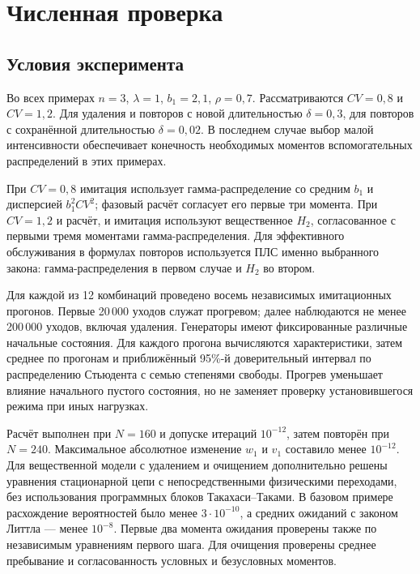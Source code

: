 \documentclass[a4paper,12pt]{article}
\begin{document}
\section{Численная проверка}\label{sec:results}
\subsection{Условия эксперимента}
Во всех примерах \(n=3\), \(\lambda=1\), \(b_1=2{,}1\), \(\rho=0{,}7.\) Рассматриваются \(CV=0{,}8\) и \(CV=1{,}2.\) Для удаления и повторов с новой длительностью \(\delta=0{,}3\), для повторов с сохранённой длительностью \(\delta=0{,}02.\) В последнем случае выбор малой интенсивности обеспечивает конечность необходимых моментов вспомогательных распределений в этих примерах.

При \(CV=0{,}8\) имитация использует гамма-распределение со средним \(b_1\) и дисперсией \(b_1^2CV^2\); фазовый расчёт согласует его первые три момента. При \(CV=1{,}2\) и расчёт, и имитация используют вещественное \(H_2\), согласованное с первыми тремя моментами гамма-распределения. Для эффективного обслуживания в формулах повторов используется ПЛС именно выбранного закона: гамма-распределения в первом случае и \(H_2\) во втором.

Для каждой из 12 комбинаций проведено восемь независимых имитационных прогонов. Первые 20\,000 уходов служат прогревом; далее наблюдаются не менее 200\,000 уходов, включая удаления. Генераторы имеют фиксированные различные начальные состояния. Для каждого прогона вычисляются характеристики, затем среднее по прогонам и приближённый 95\%-й доверительный интервал по распределению Стьюдента с семью степенями свободы. Прогрев уменьшает влияние начального пустого состояния, но не заменяет проверку установившегося режима при иных нагрузках.

Расчёт выполнен при \(N=160\) и допуске итераций \(10^{-12}\), затем повторён при \(N=240.\) Максимальное абсолютное изменение \(w_1\) и \(v_1\) составило менее \(10^{-12}.\) Для вещественной модели с удалением и очищением дополнительно решены уравнения стационарной цепи с непосредственными физическими переходами, без использования программных блоков Такахаси--Таками. В базовом примере расхождение вероятностей было менее \(3\cdot10^{-10}\), а средних ожиданий с законом Литтла --- менее \(10^{-8}.\) Первые два момента ожидания проверены также по независимым уравнениям первого шага. Для очищения проверены среднее пребывание и согласованность условных и безусловных моментов.
\end{document}
